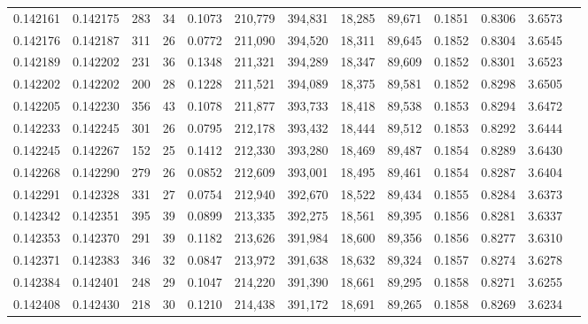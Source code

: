 \begin{tabular}{rrrrrrrrrrrrr}
0.142161 & 0.142175 &   283 &  34 &                                     0.1073 & 210,779 & 394,831 &  18,285 &  89,671 & 0.1851 & 0.8306 & 3.6573 \\
0.142176 & 0.142187 &   311 &  26 &                                     0.0772 & 211,090 & 394,520 &  18,311 &  89,645 & 0.1852 & 0.8304 & 3.6545 \\
0.142189 & 0.142202 &   231 &  36 &                                     0.1348 & 211,321 & 394,289 &  18,347 &  89,609 & 0.1852 & 0.8301 & 3.6523 \\
0.142202 & 0.142202 &   200 &  28 &                                     0.1228 & 211,521 & 394,089 &  18,375 &  89,581 & 0.1852 & 0.8298 & 3.6505 \\
0.142205 & 0.142230 &   356 &  43 &                                     0.1078 & 211,877 & 393,733 &  18,418 &  89,538 & 0.1853 & 0.8294 & 3.6472 \\
0.142233 & 0.142245 &   301 &  26 &                                     0.0795 & 212,178 & 393,432 &  18,444 &  89,512 & 0.1853 & 0.8292 & 3.6444 \\
0.142245 & 0.142267 &   152 &  25 &                                     0.1412 & 212,330 & 393,280 &  18,469 &  89,487 & 0.1854 & 0.8289 & 3.6430 \\
0.142268 & 0.142290 &   279 &  26 &                                     0.0852 & 212,609 & 393,001 &  18,495 &  89,461 & 0.1854 & 0.8287 & 3.6404 \\
0.142291 & 0.142328 &   331 &  27 &                                     0.0754 & 212,940 & 392,670 &  18,522 &  89,434 & 0.1855 & 0.8284 & 3.6373 \\
0.142342 & 0.142351 &   395 &  39 &                                     0.0899 & 213,335 & 392,275 &  18,561 &  89,395 & 0.1856 & 0.8281 & 3.6337 \\
0.142353 & 0.142370 &   291 &  39 &                                     0.1182 & 213,626 & 391,984 &  18,600 &  89,356 & 0.1856 & 0.8277 & 3.6310 \\
0.142371 & 0.142383 &   346 &  32 &                                     0.0847 & 213,972 & 391,638 &  18,632 &  89,324 & 0.1857 & 0.8274 & 3.6278 \\
0.142384 & 0.142401 &   248 &  29 &                                     0.1047 & 214,220 & 391,390 &  18,661 &  89,295 & 0.1858 & 0.8271 & 3.6255 \\
0.142408 & 0.142430 &   218 &  30 &                                     0.1210 & 214,438 & 391,172 &  18,691 &  89,265 & 0.1858 & 0.8269 & 3.6234 \\

\end{tabular}
